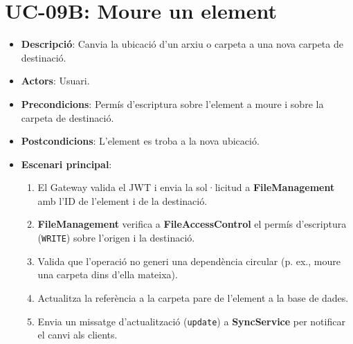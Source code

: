 \section{UC-09B: Moure un element}
\begin{itemize}
    \item \textbf{Descripció}: Canvia la ubicació d'un arxiu o carpeta a una nova carpeta de destinació.
    \item \textbf{Actors}: Usuari.
    \item \textbf{Precondicions}: Permís d'escriptura sobre l'element a moure i sobre la carpeta de destinació.
    \item \textbf{Postcondicions}: L'element es troba a la nova ubicació.
    \item \textbf{Escenari principal}:
    \begin{enumerate}
        \item El Gateway valida el JWT i envia la sol·licitud a \textbf{FileManagement} amb l'ID de l'element i de la destinació.
        \item \textbf{FileManagement} verifica a \textbf{FileAccessControl} el permís d'escriptura (\texttt{WRITE}) sobre l'origen i la destinació.
        \item Valida que l'operació no generi una dependència circular (p. ex., moure una carpeta dins d'ella mateixa).
        \item Actualitza la referència a la carpeta pare de l'element a la base de dades.
        \item Envia un missatge d'actualització (\texttt{update}) a \textbf{SyncService} per notificar el canvi als clients.
    \end{enumerate}
\end{itemize}


